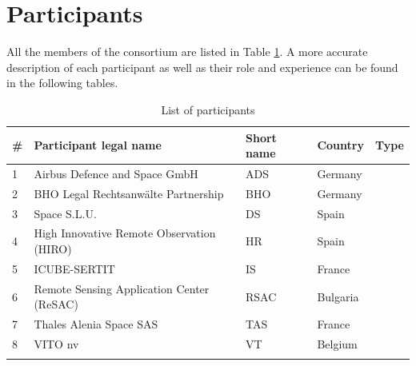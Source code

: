 \section{Participants}
All the members of the consortium are listed in Table \ref{participants}. A more accurate description of each participant as well as their role and experience can be found in the following tables.
\begin{longtable}[H]{p{1cm} p{5.7cm} p{2cm} p{2cm} p{2cm}}
	\toprule[2pt]
	
	\textbf{\#} & \textbf{Participant legal name} & \textbf{Short name} & \textbf{Country} & \textbf{Type} \\
	
	\midrule[1.5pt] 
	\endhead
	
	1 & Airbus Defence and Space GmbH & ADS & Germany &  \vspace{0.2cm} \\	\midrule
	
	2 & BHO Legal Rechtsanwälte Partnership & BHO & Germany &  \vspace{0.2cm} \\	\midrule
	
	3 &  Space S.L.U. & DS & Spain &  \vspace{0.2cm} \\ \midrule
	
	4 & High Innovative Remote Observation (HIRO) & HR & Spain &  \vspace{0.2cm} \\ \midrule
	
	5 & ICUBE-SERTIT & IS & France &  \vspace{0.2cm} \\ \midrule
	
	6 & Remote Sensing Application Center (ReSAC) & RSAC & Bulgaria &  \vspace{0.2cm} \\ \midrule
	
	7 & Thales Alenia Space SAS & TAS & France &  \vspace{0.2cm} \\ \midrule
	
	8 & VITO nv & VT & Belgium &  \vspace{0.2cm} \\ \bottomrule[2pt]
	
	\caption{List of participants}
	\label{participants}
\end{longtable}

